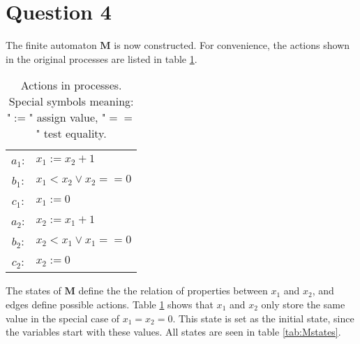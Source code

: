 \section*{Question 4}


The finite automaton $\mathbf{M}$ is now constructed. For convenience, the actions shown in the original processes are listed in table \ref{tab:actions}.

\begin{table}[H]
    \centering
    \begin{tabular}{cl}
    
    $a_1$:   &   $x_1 := x_2 + 1$   \vspace{2 mm}\\
    $b_1$:   &   $x_1 < x_2 \vee x_2 == 0$ \vspace{2 mm}\\
    $c_1$:   &   $x_1 := 0 $ \vspace{2 mm}\\
    $a_2$:   &   $x_2 := x_1 + 1$ \vspace{2 mm}\\
    $b_2$:   &   $x_2 < x_1 \vee x_1 == 0 $ \vspace{2 mm}\\
    $c_2$:   &   $x_2 := 0$ \\ 
    \end{tabular}
    \caption{Actions in processes. Special symbols meaning: "$:=$" assign value, "$==$" test equality.}
    \label{tab:actions}
\end{table}


The states of $\mathbf{M}$ define the the relation of properties between $x_1$ and $x_2$, and edges define possible actions. Table \ref{tab:actions} shows that $x_1$ and $x_2$ only store the same value in the special case of $x_1 = x_2 = 0$. This state is set as the initial state, since the variables start with these values. All states are seen in table \ref{tab:Mstates}. 


